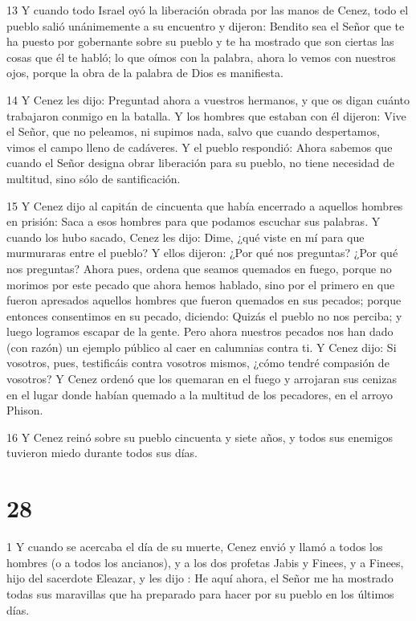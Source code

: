 \par 13 Y cuando todo Israel oyó la liberación obrada por las manos de Cenez, todo el pueblo salió unánimemente a su encuentro y dijeron: Bendito sea el Señor que te ha puesto por gobernante sobre su pueblo y te ha mostrado que son ciertas las cosas que él te habló; lo que oímos con la palabra, ahora lo vemos con nuestros ojos, porque la obra de la palabra de Dios es manifiesta.

\par 14 Y Cenez les dijo: Preguntad ahora a vuestros hermanos, y que os digan cuánto trabajaron conmigo en la batalla. Y los hombres que estaban con él dijeron: Vive el Señor, que no peleamos, ni supimos nada, salvo que cuando despertamos, vimos el campo lleno de cadáveres. Y el pueblo respondió: Ahora sabemos que cuando el Señor designa obrar liberación para su pueblo, no tiene necesidad de multitud, sino sólo de santificación.

\par 15 Y Cenez dijo al capitán de cincuenta que había encerrado a aquellos hombres en prisión: Saca a esos hombres para que podamos escuchar sus palabras. Y cuando los hubo sacado, Cenez les dijo: Dime, ¿qué viste en mí para que murmuraras entre el pueblo? Y ellos dijeron: ¿Por qué nos preguntas? ¿Por qué nos preguntas? Ahora pues, ordena que seamos quemados en fuego, porque no morimos por este pecado que ahora hemos hablado, sino por el primero en que fueron apresados ​​aquellos hombres que fueron quemados en sus pecados; porque entonces consentimos en su pecado, diciendo: Quizás el pueblo no nos perciba; y luego logramos escapar de la gente. Pero ahora nuestros pecados nos han dado (con razón) un ejemplo público al caer en calumnias contra ti. Y Cenez dijo: Si vosotros, pues, testificáis contra vosotros mismos, ¿cómo tendré compasión de vosotros? Y Cenez ordenó que los quemaran en el fuego y arrojaran sus cenizas en el lugar donde habían quemado a la multitud de los pecadores, en el arroyo Phison.

\par 16 Y Cenez reinó sobre su pueblo cincuenta y siete años, y todos sus enemigos tuvieron miedo durante todos sus días.

\chapter{28}

\par 1 Y cuando se acercaba el día de su muerte, Cenez envió y llamó a todos los hombres (o a todos los ancianos), y a los dos profetas Jabis y Finees, y a Finees, hijo del sacerdote Eleazar, y les dijo : He aquí ahora, el Señor me ha mostrado todas sus maravillas que ha preparado para hacer por su pueblo en los últimos días.


